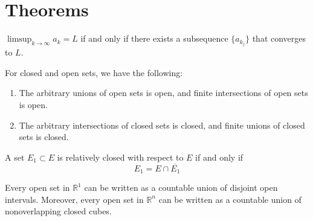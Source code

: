 \documentclass[openany]{book}
\newcommand{\R}{\mathbb{R}}
\begin{document}
\chapter{Theorems}
\begin{prop}
    $\limsup_{k\to\infty}a_k=L$ if and only if there exists a subsequence $\{a_{k_j}\}$ that converges to $L$.
\end{prop}
\begin{prop}
    For closed and open sets, we have the following:
    \begin{enumerate}
        \item The arbitrary unions of open sets is open, and finite intersections of open sets is open.
        \item The arbitrary intersections of closed sets is closed, and finite unions of closed sets is closed.
    \end{enumerate}
\end{prop}
\begin{prop}
    A set $E_1\subset E$ is relatively closed with respect to $E$ if and only if
    \begin{equation*}
        E_1=E\cap \overline{E_1}
    \end{equation*}
\end{prop}
\begin{prop}
    Every open set in $\R^1$ can be written as a countable union of disjoint open intervals. Moreover, every open set in $\R^n$ can be written as a countable union of nonoverlapping closed cubes. 
\end{prop}
\end{document}
